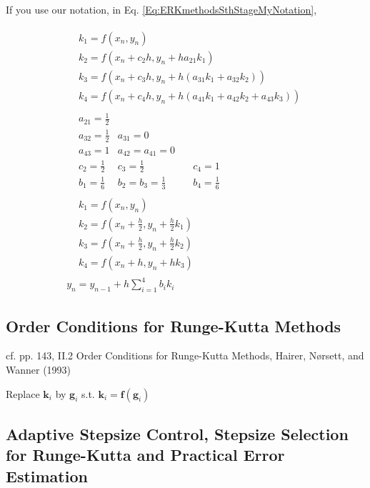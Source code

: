 \documentclass[10pt]{amsart}
\begin{document}
\begin{multicols*}{2}
If you use our notation, in Eq. \ref{Eq:ERKmethodsSthStageMyNotation}, 

\begin{equation}
\begin{gathered}
	\begin{aligned}
		& k_1 = f(x_n, y_n) \\
		& k_2 = f(x_n + c_2h, y_n + ha_{21}k_1) \\
		& k_3 = f(x_n + c_3h , y_n + h (a_{31} k_1+ a_{32}k_2)) \\
		& k_4 = f(x_n + c_4h, y_n + h(a_{41} k_1 + a_{42} k_2 + a_{43}k_3))
	\end{aligned} \\
\begin{aligned}
	& a_{21} = \frac{1}{2} & & \\
	& a_{32} = \frac{1}{2} & a_{31} = 0 & \\
	& a_{43} = 1 & a_{42} = a_{41} = 0 & \\
	& c_2 = \frac{1}{2} & c_3 = \frac{1}{2} & \quad c_4 = 1 \\ 
	& b_1 = \frac{1}{6} & b_2 = b_3 = \frac{1}{3} & \quad b_4 = \frac{1}{6}
\end{aligned} \\
\begin{aligned}
	& k_1 = f(x_n, y_n) \\
	& k_2 = f(x_n + \frac{h}{2}, y_n + \frac{h}{2} k_1) \\
	& k_3 = f(x_n + \frac{h}{2}, y_n + \frac{h}{2} k_2) \\
	& k_4 = f(x_n + h, y_n + hk_3)
\end{aligned} \\
y_n = y_{n-1} + h \sum_{i=1}^4 b_i k_i
\end{gathered}
\end{equation}


\subsection{Order Conditions for Runge-Kutta Methods}

cf. pp. 143, II.2 Order Conditions for Runge-Kutta Methods, Hairer, N\o rsett, and Wanner (1993) \cite{HNW1993}

Replace $\mathbf{k}_i$ by $\mathbf{g}_i$ s.t. $\mathbf{k}_i = \mathbf{f}(\mathbf{g}_i)$

\subsection{Adaptive Stepsize Control, Stepsize Selection for Runge-Kutta and Practical Error Estimation}


\end{multicols*}
\end{document}
